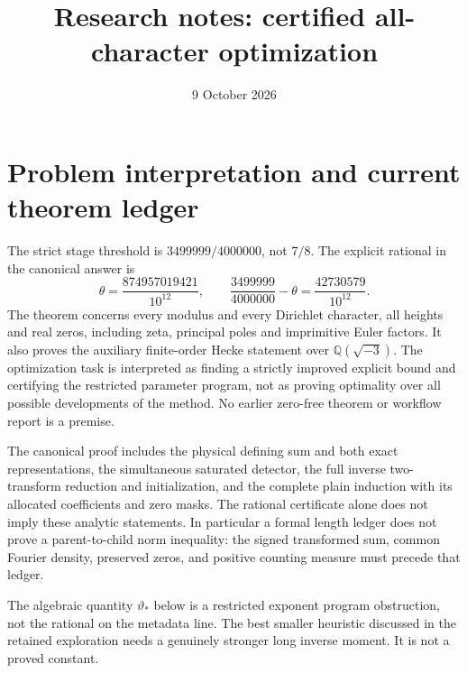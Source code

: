 \documentclass[12pt]{article}
\title{Research notes: certified all-character optimization}
\author{}
\date{9 October 2026}
\begin{document}
\maketitle

\section{Problem interpretation and current theorem ledger}
The strict stage threshold is \(3499999/4000000\), not \(7/8\).
The explicit rational in the canonical answer is
\[
 \theta=\frac{874957019421}{10^{12}},\qquad
 \frac{3499999}{4000000}-\theta=\frac{42730579}{10^{12}}.
\]
The theorem concerns every modulus and every Dirichlet character,
all heights and real zeros, including zeta, principal poles and
imprimitive Euler factors.  It also proves the auxiliary finite-order
Hecke statement over \(\mathbb Q(\sqrt{-3})\).
The optimization task is interpreted as finding a strictly improved
explicit bound and certifying the restricted parameter program,
not as proving optimality over all possible developments of the method.
No earlier zero-free theorem or workflow report is a premise.

The canonical proof includes the physical defining sum and both exact
representations, the simultaneous saturated detector, the full inverse
two-transform reduction and initialization, and the complete plain
induction with its allocated coefficients and zero masks.
The rational certificate alone does not imply these analytic statements.
In particular a formal length ledger does not prove a parent-to-child
norm inequality: the signed transformed sum, common Fourier density,
preserved zeros, and positive counting measure must precede that ledger.

The algebraic quantity \(\vartheta_*\) below is a restricted exponent
program obstruction, not the rational on the metadata line.
The best smaller heuristic discussed in the retained exploration needs
a genuinely stronger long inverse moment.  It is not a proved constant.
\end{document}
